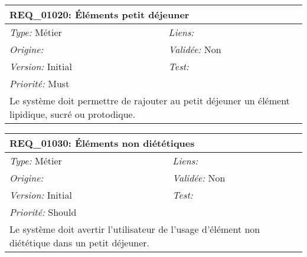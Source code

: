 \begin{table}[!h]

\begin{tabular}{|p{60mm}p{100mm}|}

\hline

\multicolumn{2}{|l|}{\textbf{REQ\_01020:} Éléments petit déjeuner} \\ \hline

\emph{Type:} Métier & \emph{Liens:}  \\

\emph{Origine:}  & \emph{Validée:} Non \\

\emph{Version:} Initial & \emph{Test:}  \\

\emph{Priorité:} Must & \\ \hline

\multicolumn{2}{|p{16cm}|}{Le système doit permettre de rajouter au petit déjeuner un élément lipidique, sucré ou protodique.} \\ \hline

\end{tabular}

\end{table}



\begin{table}[!h]

\begin{tabular}{|p{60mm}p{100mm}|}

\hline

\multicolumn{2}{|l|}{\textbf{REQ\_01030:} Éléments non diététiques} \\ \hline

\emph{Type:} Métier & \emph{Liens:}  \\

\emph{Origine:}  & \emph{Validée:} Non \\

\emph{Version:} Initial & \emph{Test:}  \\

\emph{Priorité:} Should & \\ \hline

\multicolumn{2}{|p{16cm}|}{Le système doit avertir l'utilisateur de l'usage d'élément non diététique dans un petit déjeuner.} \\ \hline

\end{tabular}

\end{table}



